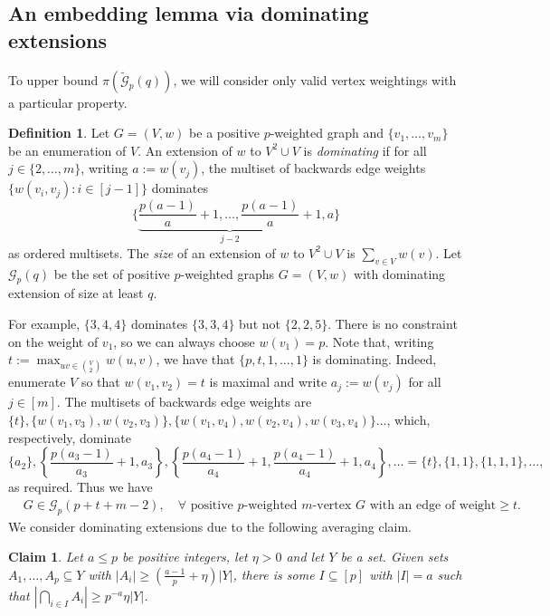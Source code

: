 \documentclass[10pt,a4paper]{article}
\newtheorem{claim}[theorem]{Claim}
\theoremstyle{definition}
\newtheorem{definition}[theorem]{Definition}
\newcommand{\cG}{\mathcal{G}}
\begin{document}
\subsection{An embedding lemma via dominating extensions}\label{sec-embedding}
To upper bound $\pi(\widetilde{\cG}_p(q))$, we will consider only valid vertex weightings with a particular property.
\begin{definition}
	Let $G=(V,w)$ be a positive $p$-weighted graph and $\lbrace v_1,\ldots,v_m\rbrace$ be an enumeration of $V$. An extension of $w$ to $V^2 \cup V$ is \emph{dominating} if  for all $j \in \{2,\ldots,m\}$, writing $a:=w(v_j)$, the multiset of backwards edge weights $\lbrace w(v_i,v_j) : i \in [j-1]\rbrace$ dominates
	$$
	\Big\lbrace \underbrace{\textstyle{\frac{p(a-1)}{a}+1,\ldots,\frac{p(a-1)}{a}+1}}_{j-2}, a\Big\rbrace
	$$
	as ordered multisets.
	The \emph{size} of an extension of $w$ to $V^2 \cup V$ is $\sum_{v \in V}w(v)$. 
	Let $\mathcal{G}_p(q)$ be the set of positive $p$-weighted graphs $G=(V,w)$ with dominating extension of size at least $q$.
\end{definition}

For example, $\{3,4,4\}$ dominates $\{3,3,4\}$ but not $\{2,2,5\}$.
There is no constraint on the weight of $v_1$, so we can always choose $w(v_1)=p$.
Note that, writing $t := \max_{uv \in \binom{V}{2}}w(u,v)$, we have that $\{p,t,1,\ldots, 1\}$ is dominating.
Indeed, enumerate $V$ so that $w(v_1,v_2)=t$ is maximal and write $a_j := w(v_j)$ for all $j \in [m]$.
The multisets of backwards edge weights are $\{t\},\{w(v_1,v_3),w(v_2,v_3)\},\{w(v_1,v_4),w(v_2,v_4),w(v_3,v_4)\}\ldots$, which, respectively,
dominate
$$
\{a_2\},\left\{\frac{p(a_3-1)}{a_3}+1, a_3\right\},\left\{\frac{p(a_4-1)}{a_4}+1,\frac{p(a_4-1)}{a_4}+1,a_4\right\},\ldots = \{t\},\{1,1\},\{1,1,1\},\ldots,
$$
as required. 
Thus we have
\begin{align}\label{eq:mq}
	&G \in \cG_p(p+t+m-2), \quad\forall\text{ positive } p\text{-weighted } m\text{-vertex } G \text{ with an edge of weight}\geq t.
\end{align}
We consider dominating extensions due to the following averaging claim.
\begin{claim}\label{cl:int}
	Let $a \leq p$ be positive integers, let $\eta > 0$ and let $Y$ be a set.
	Given sets $A_1,\ldots,A_p \subseteq Y$ with $|A_i| \geq (\frac{a-1}{p}+\eta)|Y|$, there is some $I \subseteq [p]$ with $|I|=a$ such that $|\bigcap_{i \in I}A_i| \geq p^{-a}\eta|Y|$.
\end{claim}
\end{document}
